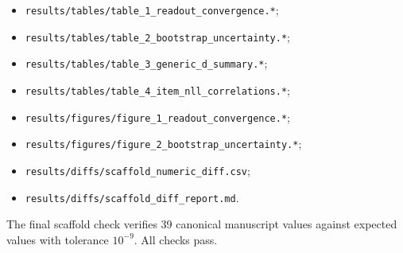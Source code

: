 \documentclass[11pt]{article}
\begin{document}
\begin{itemize}
\item \texttt{results/tables/table\_1\_readout\_convergence.*};
\item \texttt{results/tables/table\_2\_bootstrap\_uncertainty.*};
\item \texttt{results/tables/table\_3\_generic\_d\_summary.*};
\item \texttt{results/tables/table\_4\_item\_nll\_correlations.*};
\item \texttt{results/figures/figure\_1\_readout\_convergence.*};
\item \texttt{results/figures/figure\_2\_bootstrap\_uncertainty.*};
\item \texttt{results/diffs/scaffold\_numeric\_diff.csv};
\item \texttt{results/diffs/scaffold\_diff\_report.md}.
\end{itemize}

The final scaffold check verifies 39 canonical manuscript values against expected values with tolerance \(10^{-9}\). All checks pass.
\end{document}
